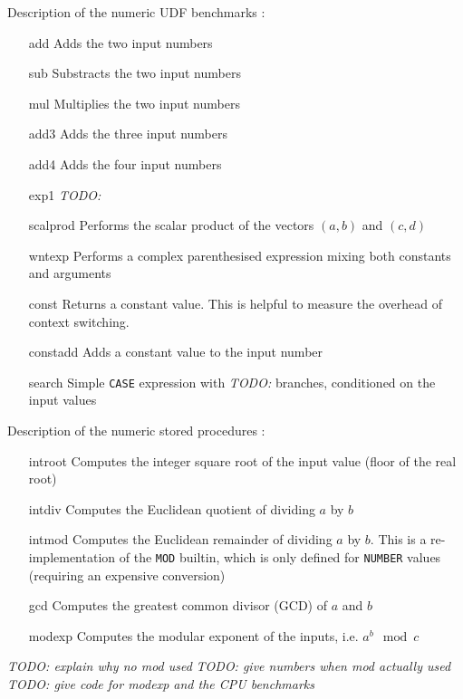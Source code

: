 \documentclass[twoside,11pt,a4paper]{article}
\newcommand{\todo}[1]{\textit{TODO: #1}}
\newcommand{\sql}[1]{\texttt{#1}}
\newcommand{\pls}[1]{\texttt{#1}}
\newcommand{\plstype}[1]{\pls{#1}}
\newcommand{\oranum}{\plstype{NUMBER}}
\newcommand{\bench}[1]{\textsf{#1}}
\begin{document}
Description of the numeric UDF benchmarks :
\begin{itemize}
\item[\bench{add}] Adds the two input numbers
\item[\bench{sub}] Substracts the two input numbers
\item[\bench{mul}] Multiplies the two input numbers
\item[\bench{add3}] Adds the three input numbers
\item[\bench{add4}] Adds the four input numbers
\item[\bench{exp1}] \todo{}
\item[\bench{scalprod}] Performs the scalar product of the vectors $(a, b)$ and $(c, d)$
\item[\bench{wntexp}] Performs a complex parenthesised expression mixing both constants and arguments
\item[\bench{const}] Returns a constant value. This is helpful to measure the overhead of context switching.
\item[\bench{constadd}] Adds a constant value to the input number
\item[\bench{search}] Simple \pls{CASE} expression with \todo{} branches, conditioned on the input values
\end{itemize}

Description of the numeric stored procedures :
\begin{itemize}
\item[\bench{introot}] Computes the integer square root of the input value (floor of the real root)
\item[\bench{intdiv}] Computes the Euclidean quotient of dividing $a$ by $b$
\item[\bench{intmod}] Computes the Euclidean remainder of dividing $a$ by $b$. This is a re-implementation of the \sql{MOD} builtin, which is only defined for \oranum{} values (requiring an expensive conversion)
\item[\bench{gcd}] Computes the greatest common divisor (GCD) of $a$ and $b$
\item[\bench{modexp}] Computes the modular exponent of the inputs, i.e. $a^b \mod c$
\end{itemize}

\todo{explain why no mod used}
\todo{give numbers when mod actually used}
\todo{give code for modexp and the CPU benchmarks}
\end{document}
